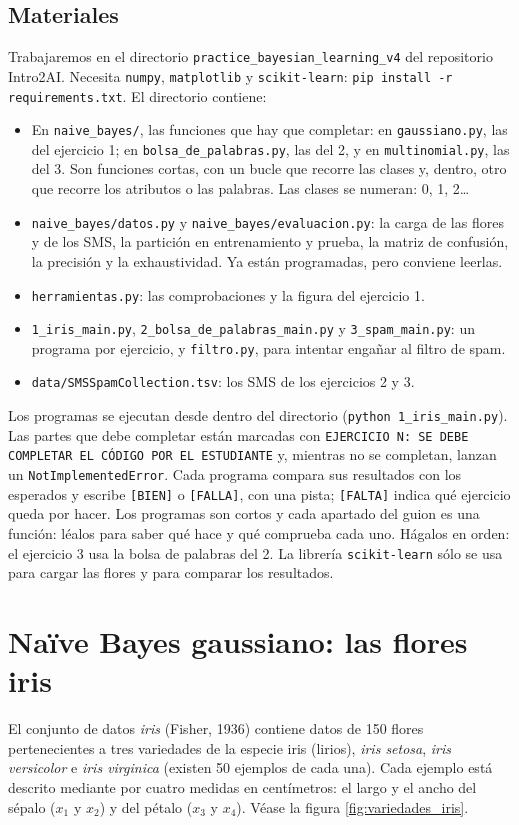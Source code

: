 \documentclass{article}
\begin{document}
\subsection*{Materiales}
Trabajaremos en el directorio \texttt{practice\_bayesian\_learning\_v4} del repositorio Intro2AI. Necesita \texttt{numpy}, \texttt{matplotlib} y \texttt{scikit-learn}: \texttt{pip install -r requirements.txt}. El directorio contiene:
\begin{itemize}
    \item En \texttt{naive\_bayes/}, las funciones que hay que completar: en \texttt{gaussiano.py}, las del ejercicio 1; en \texttt{bolsa\_de\_palabras.py}, las del 2, y en \texttt{multinomial.py}, las del 3. Son funciones cortas, con un bucle que recorre las clases y, dentro, otro que recorre los atributos o las palabras. Las clases se numeran: 0, 1, 2\dots
    \item \texttt{naive\_bayes/datos.py} y \texttt{naive\_bayes/evaluacion.py}: la carga de las flores y de los SMS, la partición en entrenamiento y prueba, la matriz de confusión, la precisión y la exhaustividad. Ya están programadas, pero conviene leerlas.
    \item \texttt{herramientas.py}: las comprobaciones y la figura del ejercicio 1.
    \item \texttt{1\_iris\_main.py}, \texttt{2\_bolsa\_de\_palabras\_main.py} y \texttt{3\_spam\_main.py}: un programa por ejercicio, y \texttt{filtro.py}, para intentar engañar al filtro de spam.
    \item \texttt{data/SMSSpamCollection.tsv}: los SMS de los ejercicios 2 y 3.
\end{itemize}
Los programas se ejecutan desde dentro del directorio (\texttt{python 1\_iris\_main.py}). Las partes que debe completar están marcadas con \texttt{EJERCICIO N: SE DEBE COMPLETAR EL CÓDIGO POR EL ESTUDIANTE} y, mientras no se completan, lanzan un \texttt{NotImplementedError}. Cada programa compara sus resultados con los esperados y escribe \texttt{[BIEN]} o \texttt{[FALLA]}, con una pista; \texttt{[FALTA]} indica qué ejercicio queda por hacer. Los programas son cortos y cada apartado del guion es una función: léalos para saber qué hace y qué comprueba cada uno. Hágalos en orden: el ejercicio 3 usa la bolsa de palabras del 2. La librería \texttt{scikit-learn} sólo se usa para cargar las flores y para comparar los resultados.


\section{Naïve Bayes gaussiano: las flores iris}
El conjunto de datos \textit{iris} (Fisher, 1936) contiene datos de  150 flores pertenecientes a tres variedades de la especie iris (lirios), \textit{iris setosa}, \textit{iris versicolor} e \textit{iris virginica} (existen 50 ejemplos de cada una). Cada ejemplo está descrito mediante por cuatro medidas en centímetros: el largo y el ancho del sépalo ($x_1$ y $x_2$) y del pétalo ($x_3$ y $x_4$). Véase la figura \ref{fig:variedades_iris}.
\end{document}
